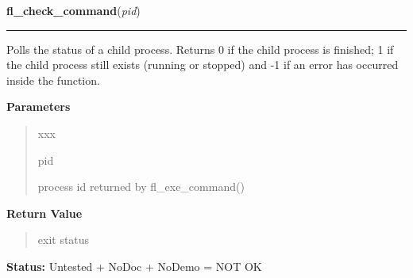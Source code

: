 \hspace{.8\funcindent}\begin{boxedminipage}{\funcwidth}

    \raggedright \textbf{fl\_check\_command}(\textit{pid})

    \vspace{-1.5ex}

    \rule{\textwidth}{0.5\fboxrule}
\setlength{\parskip}{2ex}
    Polls the status of a child process. Returns 0 if the child process is 
    finished; 1 if the child process still exists (running or stopped) and 
    -1 if an error has occurred inside the function.

\setlength{\parskip}{1ex}
      \textbf{Parameters}
      \vspace{-1ex}

      \begin{quote}
        \begin{Ventry}{xxx}

          \item[pid]

          process id returned by fl\_exe\_command()

        \end{Ventry}

      \end{quote}

      \textbf{Return Value}
    \vspace{-1ex}

      \begin{quote}
      exit status

      \end{quote}

\textbf{Status:} Untested + NoDoc + NoDemo = NOT OK



    \end{boxedminipage}

    \label{xformslib:flgoodies:fl_popen}

    \vspace{0.5ex}

